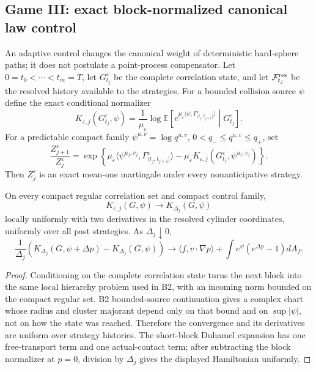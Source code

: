 \subsection{Game III: exact block-normalized canonical law control}

An adaptive control changes the canonical weight of deterministic hard-sphere
paths; it does not postulate a point-process compensator.  Let
\(0=t_0<\cdots<t_m=T\), let \(G_{t_j}^\varepsilon\) be the complete
correlation state, and let \(\mathcal F_{t_j}^{\rm res}\) be the resolved
history available to the strategies.  For a bounded collision source \(\psi\)
define the exact conditional normalizer
\[
 K_{\varepsilon,j}(G_{t_j}^\varepsilon,\psi)
 =\frac1{\mu_\varepsilon}
 \log\mathbb E\left[
 e^{\mu_\varepsilon\langle\psi,
 \Gamma_{(t_j,t_{j+1}]}^\varepsilon\rangle}
 \middle|G_{t_j}^\varepsilon\right].
\]
For a predictable compact family
\(\psi^{u,v}=\log q^{u,v}\),
\(0<q_-\le q^{u,v}\le q_+\), set
\[
 \frac{Z_{j+1}^\varepsilon}{Z_j^\varepsilon}
 =\exp\left\{
 \mu_\varepsilon\langle\psi^{u_j,v_j},
 \Gamma_{(t_j,t_{j+1}]}^\varepsilon\rangle
 -\mu_\varepsilon
 K_{\varepsilon,j}(G_{t_j}^\varepsilon,
 \psi^{u_j,v_j})\right\}.
\]
Then \(Z_j^\varepsilon\) is an exact mean-one martingale under every
nonanticipative strategy.

\begin{lemma}
\label{lem:r4-c1-conditional-chart}
On every compact regular correlation set and compact control family,
\[
 K_{\varepsilon,j}(G,\psi)
 \longrightarrow K_{\Delta_j}(G,\psi)
\]
locally uniformly with two derivatives in the resolved cylinder coordinates,
uniformly over all past strategies.  As \(\Delta_j\downarrow0\),
\[
 \frac1{\Delta_j}
 \left(K_{\Delta_j}(G,\psi+\Delta p)-K_{\Delta_j}(G,\psi)
 \right)
 \longrightarrow
 \langle f,v\cdot\nabla p\rangle
 +\int e^\psi(e^{\Delta p}-1)dA_f.
\]
\end{lemma}

\begin{proof}
Conditioning on the complete correlation state turns the next block into the
same local hierarchy problem used in B2, with an incoming norm bounded on the
compact regular set.  B2 bounded-source continuation gives a complex chart
whose radius and cluster majorant depend only on that bound and on
\(\sup|\psi|\), not on how the state was reached.  Therefore the convergence
and its derivatives are uniform over strategy histories.  The short-block
Duhamel expansion has one free-transport term and one actual-contact term;
after subtracting the block normalizer at \(p=0\), division by
\(\Delta_j\) gives the displayed Hamiltonian uniformly.
\end{proof}

